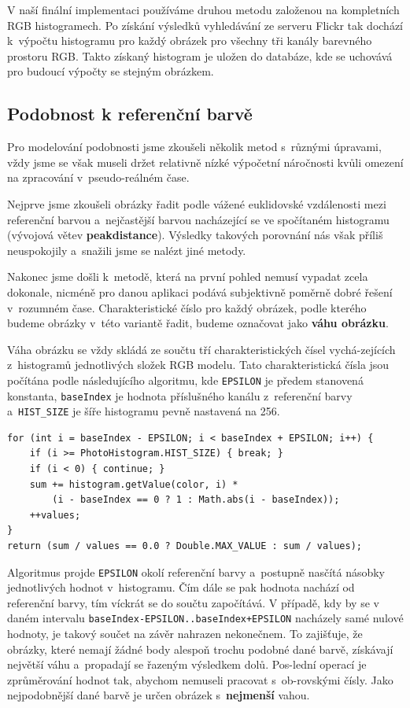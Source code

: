 \documentclass[12pt,oneside,a4paper]{article}
\newenvironment{listing}
{\begin{list}{}{\setlength{\leftmargin}{1em}}\item\scriptsize\bfseries}
{\end{list}}
\begin{document}
V naší finální implementaci používáme druhou metodu založenou na kompletních RGB histogramech. Po získání výsledků vyhledávání ze serveru Flickr tak dochází k~výpočtu histogramu pro každý obrázek pro všechny tři kanály barevného prostoru RGB. Takto získaný histogram je uložen do databáze, kde se uchovává pro budoucí výpočty se stejným obrázkem.

\subsection{Podobnost k referenční barvě}
\label{sec:podobnost}

Pro modelování podobnosti jsme zkoušeli několik metod s~různými úpravami, vždy jsme se však museli držet relativně nízké výpočetní náročnosti kvůli omezení na zpracování v~pseudo-reálném čase.

Nejprve jsme zkoušeli obrázky řadit podle vážené euklidovské vzdálenosti mezi referenční barvou a~nejčastější barvou nacházející se ve spočítaném histogramu (vývojová větev \textbf{peakdistance}). Výsledky takových porovnání nás však příliš neuspokojily a~snažili jsme se nalézt jiné metody.

Nakonec jsme došli k~metodě, která na první pohled nemusí vypadat zcela dokonale, nicméně pro danou aplikaci podává subjektivně poměrně dobré řešení v~rozumném čase. Charakteristické číslo pro každý obrázek, podle kterého budeme obrázky v~této variantě řadit, budeme označovat jako \textbf{váhu obrázku}.

Váha obrázku se vždy skládá ze součtu tří charakteristických čísel vychá-zejících z~histogramů jednotlivých složek RGB modelu. Tato charakteristická čísla jsou počítána podle následujícího algoritmu, kde \texttt{EPSILON} je předem stanovená konstanta, \texttt{baseIndex} je hodnota příslušného kanálu z~referenční barvy a~\texttt{HIST\_SIZE} je šíře histogramu pevně nastavená na 256.

\begin{listing}
\begin{verbatim}
for (int i = baseIndex - EPSILON; i < baseIndex + EPSILON; i++) {
    if (i >= PhotoHistogram.HIST_SIZE) { break; }
    if (i < 0) { continue; }
    sum += histogram.getValue(color, i) *
        (i - baseIndex == 0 ? 1 : Math.abs(i - baseIndex));
    ++values;
}
return (sum / values == 0.0 ? Double.MAX_VALUE : sum / values);
\end{verbatim}
\end{listing}

Algoritmus projde \texttt{EPSILON} okolí referenční barvy a~postupně nasčítá násobky jednotlivých hodnot v~histogramu. Čím dále se pak hodnota nachází od referenční barvy, tím víckrát se do součtu započítává. V případě, kdy by se v daném intervalu \texttt{baseIndex-EPSILON..baseIndex+EPSILON} nacházely samé nulové hodnoty, je takový součet na závěr nahrazen nekonečnem. To zajišťuje, že obrázky, které nemají žádné body alespoň trochu podobné dané barvě, získávají největší váhu a~propadají se řazeným výsledkem dolů. Pos-lední operací je zprůměrování hodnot tak, abychom nemuseli pracovat s~ob-rovskými čísly. Jako nejpodobnější dané barvě je určen obrázek s~\textbf{nejmenší} vahou.
\end{document}
